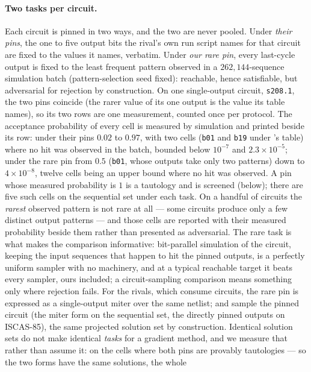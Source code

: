 \paragraph{Two tasks per circuit.}
Each circuit is pinned in two ways, and the two are never pooled. Under \emph{their pins}, the
one to five output bits the rival's own run script names for that circuit are fixed to the
values it names, verbatim. Under \emph{our rare pin}, every last-cycle output is fixed to the
least frequent pattern observed in a $262{,}144$-sequence simulation batch (pattern-selection
seed fixed): reachable, hence satisfiable, but adversarial for rejection by construction. On
one single-output circuit, \texttt{s208.1}, the two pins coincide (the rarer value of its one
output is the value its table names), so its two rows are one measurement, counted once per
protocol. The acceptance probability of every cell is measured by simulation and printed beside
its row: under their pins $0.02$ to $0.97$, with two cells (\texttt{b01} and \texttt{b19} under
\recurrent{}'s table) where no hit was observed in the batch, bounded below $10^{-7}$ and
$2.3\times10^{-5}$; under the rare pin from $0.5$ (\texttt{b01}, whose outputs take only two
patterns) down to $4\times10^{-8}$, twelve cells being an upper bound where no hit was
observed. A pin whose measured probability is $1$ is a tautology and is screened (below); there are five
such cells on the sequential set under each task. On a handful of circuits the \emph{rarest}
observed pattern is not rare at all --- some circuits produce only a few distinct output patterns
--- and those cells are reported with their measured probability beside them rather than
presented as adversarial. The rare task is what makes the comparison informative: bit-parallel simulation of
the circuit, keeping the input sequences that happen to hit the pinned outputs, is a perfectly
uniform sampler with no \cnf{} machinery, and at a typical reachable target it beats every
\cnf{} sampler, ours included; a circuit-sampling comparison means something only where
rejection fails. For the rivals, which consume circuits, the rare pin is expressed as a
single-output miter over the same netlist; \gpap{} and \cmsgen{} sample the pinned circuit
(the miter form on the sequential set, the directly pinned outputs on ISCAS-85), the same
projected solution set by construction. Identical solution sets do not make identical
\emph{tasks} for a gradient method, and we measure that rather than assume it: on the cells
where both pins are provably tautologies --- so the two forms have the same solutions, the whole

